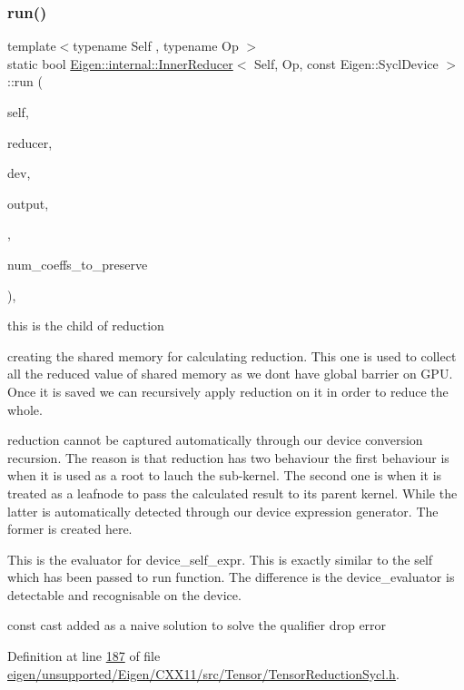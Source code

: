 \subsubsection{\texorpdfstring{run()}{run()}\hspace{0.1cm}{\footnotesize\ttfamily [1/2]}}
{\footnotesize\ttfamily template$<$typename Self , typename Op $>$ \\
static bool \hyperlink{struct_eigen_1_1internal_1_1_inner_reducer}{Eigen\+::internal\+::\+Inner\+Reducer}$<$ Self, Op, const Eigen\+::\+Sycl\+Device $>$\+::run (\begin{DoxyParamCaption}\item[{const Self \&}]{self,  }\item[{Op \&}]{reducer,  }\item[{const Eigen\+::\+Sycl\+Device \&}]{dev,  }\item[{Coeff\+Return\+Type $\ast$}]{output,  }\item[{typename Self\+::\+Index}]{,  }\item[{typename Self\+::\+Index}]{num\+\_\+coeffs\+\_\+to\+\_\+preserve }\end{DoxyParamCaption})\hspace{0.3cm}{\ttfamily [inline]}, {\ttfamily [static]}}

this is the child of reduction

creating the shared memory for calculating reduction. This one is used to collect all the reduced value of shared memory as we dont have global barrier on G\+PU. Once it is saved we can recursively apply reduction on it in order to reduce the whole.

reduction cannot be captured automatically through our device conversion recursion. The reason is that reduction has two behaviour the first behaviour is when it is used as a root to lauch the sub-\/kernel. The second one is when it is treated as a leafnode to pass the calculated result to its parent kernel. While the latter is automatically detected through our device expression generator. The former is created here.

This is the evaluator for device\+\_\+self\+\_\+expr. This is exactly similar to the self which has been passed to run function. The difference is the device\+\_\+evaluator is detectable and recognisable on the device.

const cast added as a naive solution to solve the qualifier drop error 

Definition at line \hyperlink{eigen_2unsupported_2_eigen_2_c_x_x11_2src_2_tensor_2_tensor_reduction_sycl_8h_source_l00187}{187} of file \hyperlink{eigen_2unsupported_2_eigen_2_c_x_x11_2src_2_tensor_2_tensor_reduction_sycl_8h_source}{eigen/unsupported/\+Eigen/\+C\+X\+X11/src/\+Tensor/\+Tensor\+Reduction\+Sycl.\+h}.

